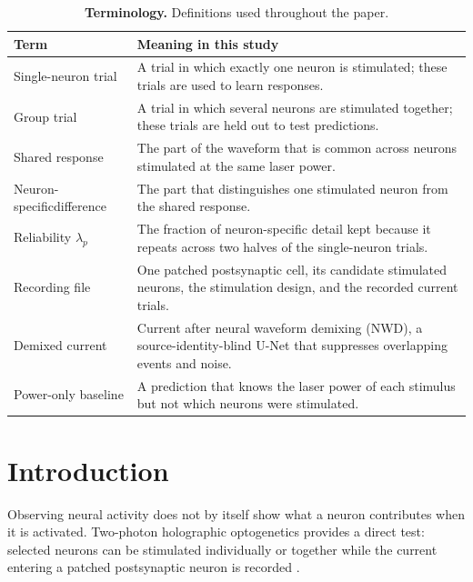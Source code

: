 \documentclass[10pt,twocolumn]{article}
\begin{document}
\begin{table}[t]
  \centering
  \caption{\textbf{Terminology.} Definitions used throughout the paper.}
  \label{tab:glossary}
  \begin{tabular}{@{}p{}p{}@{}}
    \toprule
    Term & Meaning in this study \\
    \midrule
    Single-neuron trial & A trial in which exactly one neuron is stimulated;
    these trials are used to learn responses. \\
    Group trial & A trial in which several neurons are stimulated together;
    these trials are held out to test predictions. \\
    Shared response & The part of the waveform that is common across neurons
    stimulated at the same laser power. \\
    Neuron-specific\newline difference & The part that distinguishes one stimulated
    neuron from the shared response. \\
    Reliability $\lambda_p$ & The fraction of neuron-specific detail kept
    because it repeats across two halves of the single-neuron trials. \\
    Recording file & One patched postsynaptic cell, its candidate stimulated
    neurons, the stimulation design, and the recorded current trials. \\
    Demixed current & Current after neural waveform demixing (NWD), a
    source-identity-blind U-Net that suppresses overlapping events and noise. \\
    Power-only baseline & A prediction that knows the laser power of each
    stimulus but not which neurons were stimulated. \\
    \bottomrule
  \end{tabular}
\end{table}

\section{Introduction}

Observing neural activity does not by itself show what a neuron contributes
when it is activated. Two-photon holographic optogenetics provides a direct
test: selected neurons can be stimulated individually or together while the
current entering a patched postsynaptic neuron is recorded
\citep{packer2012two,packer2015simultaneous,mardinly2018precise,
adesnik2021probing}.
\end{document}
